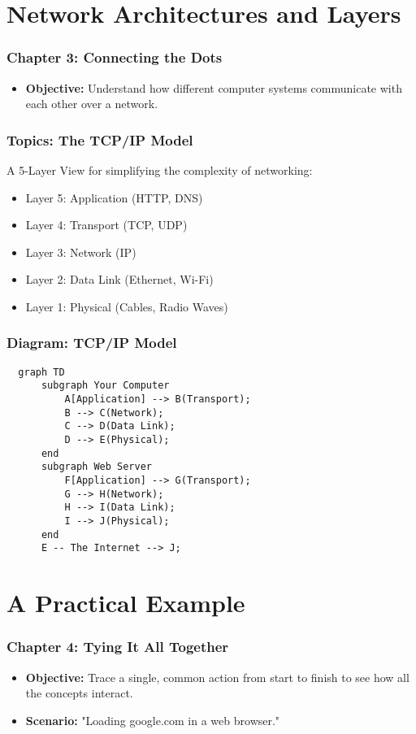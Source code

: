 \documentclass{beamer}
\begin{document}
\section{Network Architectures and Layers}

\begin{frame}
  \frametitle{Chapter 3: Connecting the Dots}
  \begin{itemize}
    \item \textbf{Objective:} Understand how different computer systems communicate with each other over a network.
  \end{itemize}
\end{frame}

\begin{frame}[fragile]
  \frametitle{Topics: The TCP/IP Model}
  A 5-Layer View for simplifying the complexity of networking:
  \begin{itemize}
    \item Layer 5: Application (HTTP, DNS)
    \item Layer 4: Transport (TCP, UDP)
    \item Layer 3: Network (IP)
    \item Layer 2: Data Link (Ethernet, Wi-Fi)
    \item Layer 1: Physical (Cables, Radio Waves)
  \end{itemize}
\end{frame}

\begin{frame}[fragile]
  \frametitle{Diagram: TCP/IP Model}
  \begin{verbatim}
  graph TD
      subgraph Your Computer
          A[Application] --> B(Transport);
          B --> C(Network);
          C --> D(Data Link);
          D --> E(Physical);
      end
      subgraph Web Server
          F[Application] --> G(Transport);
          G --> H(Network);
          H --> I(Data Link);
          I --> J(Physical);
      end
      E -- The Internet --> J;
  \end{verbatim}
\end{frame}

\section{A Practical Example}

\begin{frame}
  \frametitle{Chapter 4: Tying It All Together}
  \begin{itemize}
    \item \textbf{Objective:} Trace a single, common action from start to finish to see how all the concepts interact.
    \item \textbf{Scenario:} "Loading google.com in a web browser."
  \end{itemize}
\end{frame}
\end{document}
